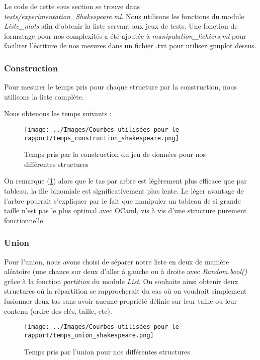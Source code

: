\documentclass[12pt,a4paper]{article}
\begin{document}
Le code de cette sous section se trouve dans \textit{tests/experimentation\_Shakespeare.ml}. Nous utilisons les fonctions du module \textit{Liste\_mots} afin d'obtenir la liste servant aux jeux de tests. Une fonction de formatage pour nos complexités a été ajoutée à \textit{manipulation\_fichiers.ml} pour faciliter l'écriture de nos mesures dans un fichier .txt pour utiliser gnuplot dessus.

\subsubsection{Construction}

Pour mesurer le temps pris pour chaque structure par la construction, nous utilisons la liste complète.

Nous obtenons les temps suivants :


\begin{figure}[hbtp]
\centering
\texttt{[image: ../Images/Courbes utilisées pour le rapport/temps\_construction\_shakespeare.png]}
\caption{Temps pris par la construction du jeu de données pour nos différentes structures}
\label{fig9}
\end{figure}

On remarque (\ref{fig9}) alors que le tas par arbre est légèrement plus efficace que par tableau, la file binomiale est significativement plus lente. Le léger avantage de l'arbre pourrait s'expliquer par le fait que manipuler un tableau de si grande taille n'est pas le plus optimal avec OCaml, vis à vis d'une structure purement fonctionnelle.


\subsubsection{Union}

Pour l'union, nous avons choisi de séparer notre liste en deux de manière aléatoire (une chance sur deux d'aller à gauche ou à droite avec \textit{Random.bool()} grâce à la fonction \textit{partition} du module \textit{List}. On souhaite ainsi obtenir deux structures où la répartition se rapprocherait du cas où on voudrait simplement fusionner deux tas sans avoir aucune propriété définie sur leur taille ou leur contenu (ordre des clés, taille, etc).


\begin{figure}[hbtp]
\centering
\texttt{[image: ../Images/Courbes utilisées pour le rapport/temps\_union\_shakespeare.png]}
\caption{Temps pris par l'union pour nos différentes structures}
\label{fig10}
\end{figure}
\end{document}
